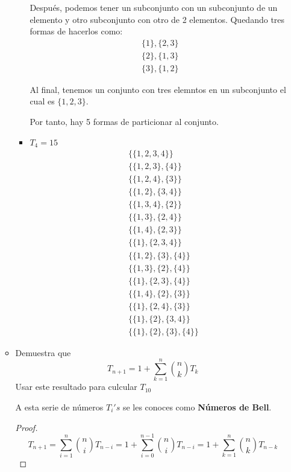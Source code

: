 \documentclass[11pt,letterpaper]{report}
\begin{document}
\begin{enumerate}
\begin{itemize}
\begin{itemize}
        Después, podemos tener un subconjunto con un subconjunto de un elemento y otro subconjunto
        con otro de 2 elementos. Quedando tres formas de hacerlos como:
        \begin{align*}
            \{1\}, \{2, 3\}\\
            \{2\}, \{1, 3\}\\
            \{3\}, \{1, 2\}
        \end{align*}

        Al final, tenemos un conjunto con tres elemntos en un subconjunto el cual es $\{1,2,3\}$.

        Por tanto, hay 5 formas de particionar al conjunto.

        \item $T_4 = 15$
        \begin{align*}
            &\{\{1, 2, 3, 4\}\}\\
            &\{\{1, 2, 3\}, \{4\}\}\\
            &\{\{1, 2, 4\}, \{3\}\}\\
            &\{\{1, 2\}, \{3, 4\}\}\\
            &\{\{1, 3, 4\}, \{2\}\}\\
            &\{\{1, 3\}, \{2, 4\}\}\\
            &\{\{1, 4\}, \{2, 3\}\}\\
            &\{\{1\}, \{2, 3, 4\}\}\\
            &\{\{1, 2\}, \{3\}, \{4\}\}\\
            &\{\{1, 3\}, \{2\}, \{4\}\}\\
            &\{\{1\}, \{2, 3\}, \{4\}\}\\
            &\{\{1, 4\}, \{2\}, \{3\}\}\\
            &\{\{1\}, \{2, 4\}, \{3\}\}\\
            &\{\{1\}, \{2\}, \{3, 4\}\}\\
            &\{\{1\}, \{2\}, \{3\}, \{4\}\}
        \end{align*}

    \end{itemize}

    \item Demuestra que
    \[
        T_{n+1} = 1 + \sum_{k=1}^{n} \binom{n}{k} T_k
    \]
    Usar este resultado para culcular $T_{10}$

    A esta serie de números $T_i's$ se les conoces como \textbf{Números de Bell}.

    \begin{proof}
        \[
            T_{n+1} = \sum_{i=1}^{n} \binom{n}{i} T_{n-i} =1 + \sum_{i=0}^{n-1} \binom{n}{i} T_{n-i} =
            1 + \sum_{k=1}^{n} \binom{n}{k} T_{n-k}
        \]
    \end{proof}


\end{itemize}
\end{enumerate}
\end{document}
